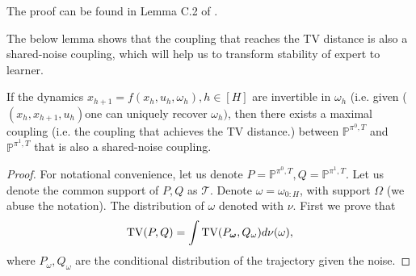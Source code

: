 \documentclass{article}
\begin{document}
The proof can be found in Lemma C.2 of \citet{block2023provable}. 


The below lemma shows that the coupling that reaches the TV distance is also a shared-noise coupling, which will help us to transform stability of expert to learner.

\begin{lemma}\label{lemma:TV_coupling_is_shared_noise}
    If the dynamics $x_{h+1}=f(x_h,u_h,\omega_h), h\in[H]$ are invertible in $\omega_h$ (i.e. given ($(x_h,x_{h+1},u_h)$one can uniquely recover $\omega_h)$, then there exists a maximal coupling (i.e. the coupling that achieves the TV distance.) between $\mathbb P^{\pi^0, T}$ and $\mathbb P^{\pi^1, T}$ that is also a shared-noise coupling.    
\end{lemma}
\begin{proof}
For notational convenience, let us denote $P = \mathbb P^{\pi^0,T}, Q=\mathbb P^{\pi^1, T}$. Let us denote the common support of $P,Q$ as $\mathcal T$. Denote $\omega = \omega_{0:H}$, with support $\Omega$ (we abuse the notation). The distribution of $\omega$ denoted with $\nu$. First we prove that 
    \begin{equation*}
        \textnormal{TV}(P,Q)= \int \textnormal{TV}(P_{\bm \omega}, Q_{ \omega})d\nu(\omega),
    \end{equation*}
    where $P_\omega, Q_\omega$ are the conditional distribution of the trajectory given the noise.


\end{proof}
\end{document}
